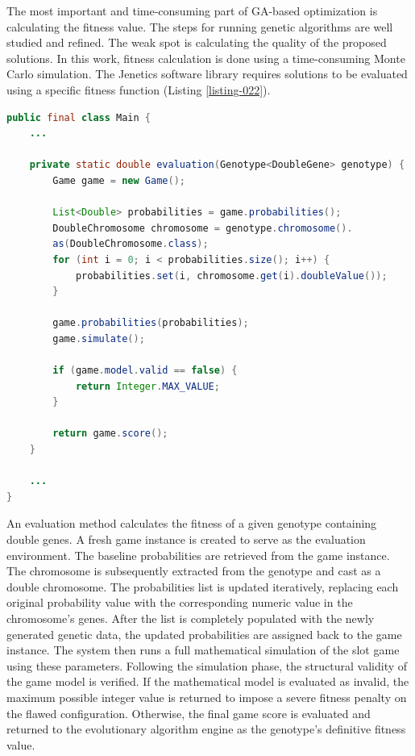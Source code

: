 \documentclass[12pt,twoside,openany]{book}
\begin{document}
The most important and time-consuming part of GA-based optimization is calculating the fitness value. The steps for running genetic algorithms are well studied and refined. The weak spot is calculating the quality of the proposed solutions. In this work, fitness calculation is done using a time-consuming Monte Carlo simulation. The Jenetics software library requires solutions to be evaluated using a specific fitness function (Listing \ref{listing-022}).

\begin{lstlisting}[language=Java, caption={Game reels goodness evaluation}, label=listing-022]
public final class Main {
	...

    private static double evaluation(Genotype<DoubleGene> genotype) {
        Game game = new Game();

        List<Double> probabilities = game.probabilities();
        DoubleChromosome chromosome = genotype.chromosome().
        as(DoubleChromosome.class);
        for (int i = 0; i < probabilities.size(); i++) {
            probabilities.set(i, chromosome.get(i).doubleValue());
        }

        game.probabilities(probabilities);
        game.simulate();

        if (game.model.valid == false) {
            return Integer.MAX_VALUE;
        }

        return game.score();
    }

	...
}
\end{lstlisting}

An evaluation method calculates the fitness of a given genotype containing double genes. A fresh game instance is created to serve as the evaluation environment. The baseline probabilities are retrieved from the game instance. The chromosome is subsequently extracted from the genotype and cast as a double chromosome. The probabilities list is updated iteratively, replacing each original probability value with the corresponding numeric value in the chromosome's genes. After the list is completely populated with the newly generated genetic data, the updated probabilities are assigned back to the game instance. The system then runs a full mathematical simulation of the slot game using these parameters. Following the simulation phase, the structural validity of the game model is verified. If the mathematical model is evaluated as invalid, the maximum possible integer value is returned to impose a severe fitness penalty on the flawed configuration. Otherwise, the final game score is evaluated and returned to the evolutionary algorithm engine as the genotype's definitive fitness value.
\end{document}
